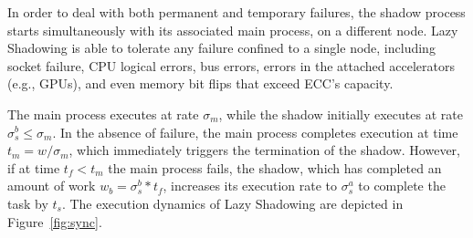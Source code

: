 In order to deal with both permanent and temporary failures, the shadow process starts simultaneously with its associated main process, on a different node. Lazy Shadowing is able to tolerate any failure confined to a single node, including socket failure, CPU logical errors, bus errors, errors in the attached accelerators (e.g., GPUs), and even memory bit flips that exceed ECC's capacity. 

The main process executes at rate $\sigma_m$, while the shadow initially executes at rate $\sigma_s^b \le \sigma_m$. %
In the absence of failure, the main process completes execution at time 
$t_m = w/\sigma_m$, which immediately triggers the termination of the
shadow. However, if at time $t_f < t_m$ the main process fails, the shadow, which has completed an amount of work $w_b=\sigma_s^b * t_f$, increases its execution rate to $\sigma_s^a$ to complete the task by $t_s$. %
The execution dynamics of Lazy Shadowing are depicted in Figure~\ref{fig:sync}.

